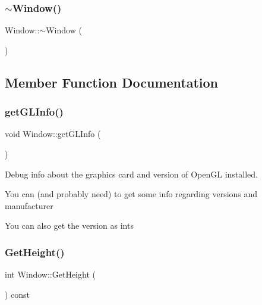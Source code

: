 \subsubsection{\texorpdfstring{$\sim$\+Window()}{~Window()}}
{\footnotesize\ttfamily Window\+::$\sim$\+Window (\begin{DoxyParamCaption}{ }\end{DoxyParamCaption})}



\subsection{Member Function Documentation}
\hypertarget{class_ori_engine_1_1_window_a8e80d9499f2968b20492b517006cc1b3}{}\label{class_ori_engine_1_1_window_a8e80d9499f2968b20492b517006cc1b3} 
\subsubsection{\texorpdfstring{get\+G\+L\+Info()}{getGLInfo()}}
{\footnotesize\ttfamily void Window\+::get\+G\+L\+Info (\begin{DoxyParamCaption}{ }\end{DoxyParamCaption})\hspace{0.3cm}{\ttfamily [private]}}



Debug info about the graphics card and version of Open\+GL installed. 

You can (and probably need) to get some info regarding versions and manufacturer

You can also get the version as ints \hypertarget{class_ori_engine_1_1_window_a2196b5ae099037272cc85b223e80bd6d}{}\label{class_ori_engine_1_1_window_a2196b5ae099037272cc85b223e80bd6d} 
\subsubsection{\texorpdfstring{Get\+Height()}{GetHeight()}}
{\footnotesize\ttfamily int Window\+::\+Get\+Height (\begin{DoxyParamCaption}{ }\end{DoxyParamCaption}) const}

